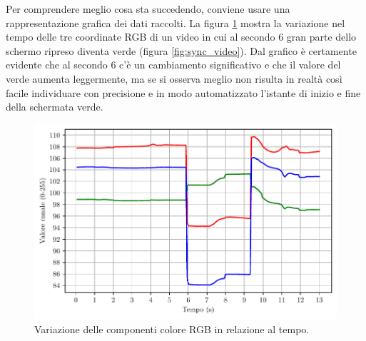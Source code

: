\inputminted[xleftmargin=\parindent,linenos]{python}{res/opencv.py}

Per comprendere meglio cosa sta succedendo, conviene usare una rappresentazione grafica dei dati raccolti. La figura \ref{fig:sync_opencv1} mostra la variazione nel tempo delle tre coordinate RGB di un video in cui al secondo 6 gran parte dello schermo ripreso diventa verde (figura \ref{fig:sync_video}). Dal grafico è certamente evidente che al secondo 6 c'è un cambiamento significativo e che il valore del verde aumenta leggermente, ma se si osserva meglio non risulta in realtà così facile individuare con precisione e in modo automatizzato l'istante di inizio e fine della schermata verde.

\begin{figure}[htbp]
	\centering
	
	\includegraphics{res/opencv_channels_tight.pdf}
	
	\caption{Variazione delle componenti colore RGB in relazione al tempo.}
	\label{fig:sync_opencv1}
\end{figure}

